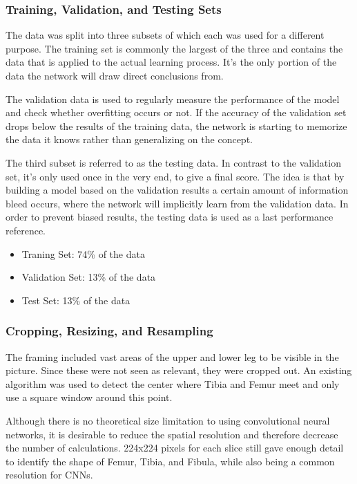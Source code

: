 \subsubsection{Training, Validation, and Testing Sets}

The data was split into three subsets of which each was used for a different purpose. The training set is commonly the largest of the three and contains the data that is applied to the actual learning process. It's the only portion of the data the network will draw direct conclusions from. 

The validation data is used to regularly measure the performance of the model and check whether overfitting occurs or not. If the accuracy of the validation set drops below the results of the training data, the network is starting to memorize the data it knows rather than generalizing on the concept.

The third subset is referred to as the testing data. In contrast to the validation set, it's only used once in the very end, to give a final score. The idea is that by building a model based on the validation results a certain amount of information bleed occurs, where the network will implicitly learn from the validation data. In order to prevent biased results, the testing data is used as a last performance reference.

\begin{itemize}
\item Traning Set: 74\% of the data
\item Validation Set: 13\% of the data
\item Test Set: 13\% of the data
\end{itemize}

\subsubsection{Cropping, Resizing, and Resampling}

The framing included vast areas of the upper and lower leg to be visible in the picture. Since these were not seen as relevant, they were cropped out. An existing algorithm was used to detect the center where Tibia and Femur meet and only use a square window around this point.

Although there is no theoretical size limitation to using convolutional neural networks, it is desirable to reduce the spatial resolution and therefore decrease the number of calculations. 224x224 pixels for each slice still gave enough detail to identify the shape of Femur, Tibia, and Fibula, while also being a common resolution for CNNs.

